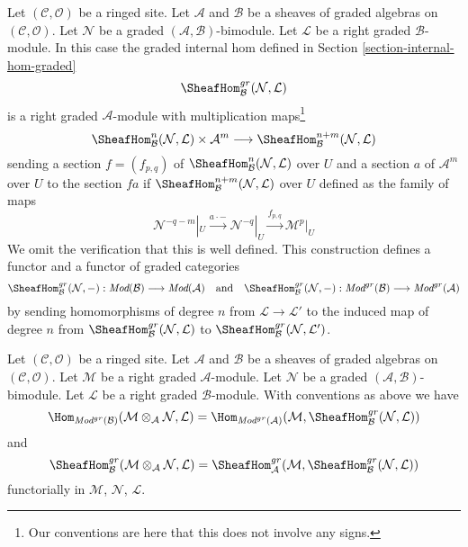 \medskip\noindent
Let $(\mathcal{C}, \mathcal{O})$ be a ringed site. Let $\mathcal{A}$
and $\mathcal{B}$ be a sheaves of graded algebras on
$(\mathcal{C}, \mathcal{O})$. Let $\mathcal{N}$ be a
graded $(\mathcal{A}, \mathcal{B})$-bimodule. Let 
$\mathcal{L}$ be a right graded $\mathcal{B}$-module.
In this case the graded internal hom
defined in Section \ref{section-internal-hom-graded}
$$
\SheafHom_\mathcal{B}^{gr}(\mathcal{N}, \mathcal{L})
$$
is a right graded $\mathcal{A}$-module with
multiplication maps\footnote{Our conventions are here
that this does not involve any signs.}
$$
\SheafHom^n_\mathcal{B}(\mathcal{N}, \mathcal{L})
\times \mathcal{A}^m
\longrightarrow
\SheafHom^{n + m}_\mathcal{B}(\mathcal{N}, \mathcal{L})
$$
sending a section $f = (f_{p,q})$ of
$\SheafHom^n_\mathcal{B}(\mathcal{N}, \mathcal{L})$ over $U$
and a section $a$ of $\mathcal{A}^m$ over $U$ to the section
$f a$ if $\SheafHom^{n + m}_\mathcal{B}(\mathcal{N}, \mathcal{L})$ over $U$
defined as the family of maps
$$
\mathcal{N}^{-q - m}|_U \xrightarrow{a \cdot -}
\mathcal{N}^{-q}|_U \xrightarrow{f_{p, q}}
\mathcal{M}^p|_U
$$
We omit the verification that this is well defined. This construction
defines a functor and a functor of graded categories
$$
\SheafHom_\mathcal{B}^{gr}(\mathcal{N}, -) :
\textit{Mod}(\mathcal{B})
\longrightarrow
\textit{Mod}(\mathcal{A})
\quad\text{and}\quad
\SheafHom_\mathcal{B}^{gr}(\mathcal{N}, -) :
\textit{Mod}^{gr}(\mathcal{B})
\longrightarrow
\textit{Mod}^{gr}(\mathcal{A})
$$
by sending homomorphisms of degree $n$ from $\mathcal{L} \to \mathcal{L}'$
to the induced map of degree $n$ from
$\SheafHom_\mathcal{B}^{gr}(\mathcal{N}, \mathcal{L})$ to
$\SheafHom_\mathcal{B}^{gr}(\mathcal{N}, \mathcal{L}')$.

\begin{lemma}
\label{lemma-tensor-hom-adjunction-gr}
Let $(\mathcal{C}, \mathcal{O})$ be a ringed site. Let $\mathcal{A}$
and $\mathcal{B}$ be a sheaves of graded algebras on
$(\mathcal{C}, \mathcal{O})$. Let $\mathcal{M}$ be a right
graded $\mathcal{A}$-module. Let $\mathcal{N}$ be a
graded $(\mathcal{A}, \mathcal{B})$-bimodule. Let $\mathcal{L}$
be a right graded $\mathcal{B}$-module. With conventions as above
we have
$$
\Hom_{\textit{Mod}^{gr}(\mathcal{B})}(
\mathcal{M} \otimes_\mathcal{A} \mathcal{N}, \mathcal{L}) =
\Hom_{\textit{Mod}^{gr}(\mathcal{A})}(
\mathcal{M}, \SheafHom_\mathcal{B}^{gr}(\mathcal{N}, \mathcal{L}))
$$
and
$$
\SheafHom_\mathcal{B}^{gr}(
\mathcal{M} \otimes_\mathcal{A} \mathcal{N}, \mathcal{L}) =
\SheafHom_\mathcal{A}^{gr}(
\mathcal{M}, \SheafHom_\mathcal{B}^{gr}(\mathcal{N}, \mathcal{L}))
$$
functorially in $\mathcal{M}$, $\mathcal{N}$, $\mathcal{L}$.
\end{lemma}

